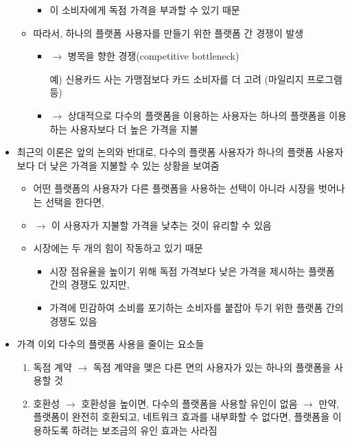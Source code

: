 \begin{itemize}
\begin{itemize}
		\begin{itemize}
		\item 이 소비자에게 독점 가격을 부과할 수 있기 때문
		\end{itemize}
	\item 따라서, 하나의 플랫폼 사용자를 만들기 위한 플랫폼 간 경쟁이 발생
		\begin{itemize}
		\item $\rightarrow$ 병목을 향한 경쟁(competitive bottleneck)
		\item[예)] 신용카드 사는 가맹점보다 카드 소비자를 더 고려 (마일리지 프로그램 등)
		\item $\rightarrow$ 상대적으로 다수의 플랫폼을 이용하는 사용자는 하나의 플랫폼을 이용하는 사용자보다 더 높은 가격을 지불
		\end{itemize}
	\end{itemize}
\item 최근의 이론은 앞의 논의와 반대로, 다수의 플랫폼 사용자가 하나의 플랫폼 사용자보다 더 낮은 가격을 지불할 수 있는 상황을 보여줌 \citep{Belleflamme:2019ts}
	\begin{itemize}
	\item 어떤 플랫폼의 사용자가 다른 플랫폼을 사용하는 선택이 아니라 시장을 벗어나는 선택을 한다면, 
	\item $\rightarrow$ 이 사용자가 지불할 가격을 낮추는 것이 유리할 수 있음
	\item 시장에는 두 개의 힘이 작동하고 있기 때문
		\begin{itemize}
		\item 시장 점유율을 높이기 위해 독점 가격보다 낮은 가격을 제시하는 플랫폼 간의 경쟁도 있지만,
		\item 가격에 민감하여 소비를 포기하는 소비자를 붙잡아 두기 위한 플랫폼 간의 경쟁도 있음
		\end{itemize}
	\end{itemize}
\item 가격 이외 다수의 플랫폼 사용을 줄이는 요소들
	\begin{enumerate}
	\item 독점 계약 $\rightarrow$ 독점 계약을 맺은 다른 면의 사용자가 있는 하나의 플랫폼을 사용할 것
	\item 호환성 $\rightarrow$ 호환성을 높이면, 다수의 플랫폼을 사용할 유인이 없음 $\rightarrow$ 만약, 플랫폼이 완전히 호환되고, 네트워크 효과를 내부화할 수 없다면, 플랫폼을 이용하도록 하려는 보조금의 유인 효과는 사라짐
	\end{enumerate}
\end{itemize}


